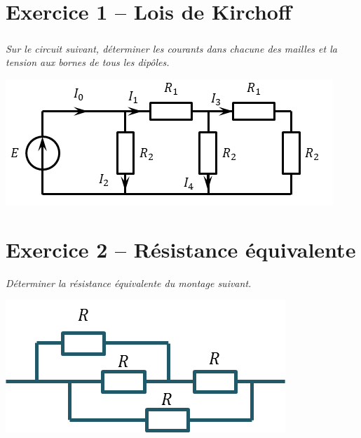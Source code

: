 \documentclass[10pt,fleqn]{article} %
\begin{document}

\vspace{5.5cm}
\pagestyle{fancy}
\thispagestyle{plain}


\def\columnseprulecolor{\color{ocre}}
\setlength{\columnseprule}{0.4pt} 

\begin{multicols}{2}
\section*{Exercice 1 -- Lois de Kirchoff}
\ifprof
\else
\fi

\subparagraph*{}
\textit{Sur le circuit suivant, déterminer les courants dans chacune des mailles et la tension aux bornes de tous les dipôles.}
\begin{center}
\includegraphics[width=\linewidth]{images/fig_03}
\end{center}


\section*{Exercice 2 -- Résistance équivalente}
\textit{Déterminer la résistance équivalente du montage suivant.}
\begin{center}
\includegraphics[width=\linewidth]{images/fig_07}
\end{center}





\end{multicols}
\end{document}
